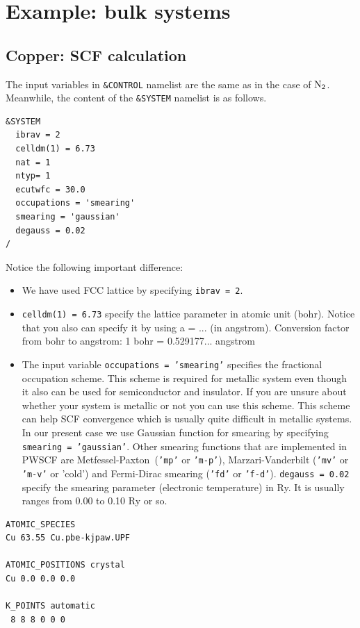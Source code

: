 \documentclass[12pt,english]{paper}
\begin{document}
\section{Example: bulk systems}


\subsection{Copper: SCF calculation}

The input variables in \texttt{\&CONTROL} namelist are the same as
in the case of $\ce{N2}$. Meanwhile, the content of the \texttt{\&SYSTEM}
namelist is as follows.

\begin{lstlisting}
&SYSTEM
  ibrav = 2
  celldm(1) = 6.73
  nat = 1
  ntyp= 1
  ecutwfc = 30.0
  occupations = 'smearing'
  smearing = 'gaussian'
  degauss = 0.02
/
\end{lstlisting}


Notice the following important difference:
\begin{itemize}
\item We have used FCC lattice by specifying \texttt{ibrav = 2}.
\item \texttt{celldm(1) = 6.73} specify the lattice parameter in atomic
unit (bohr). Notice that you also can specify it by using a = ...
(in angstrom). Conversion factor from bohr to angstrom: 1 bohr = 0.529177...
angstrom
\item The input variable \texttt{occupations = 'smearing'} specifies the
fractional occupation scheme. This scheme is required for metallic
system even though it also can be used for semiconductor and insulator.
If you are unsure about whether your system is metallic or not you
can use this scheme. This scheme can help SCF convergence which is
usually quite difficult in metallic systems. In our present case we
use Gaussian function for smearing by specifying \texttt{smearing
= 'gaussian'}. Other smearing functions that are implemented in PWSCF
are Metfessel-Paxton\texttt{ }(\texttt{'mp'} or \texttt{'m-p'}), Marzari-Vanderbilt
(\texttt{'mv'} or \texttt{'m-v'} or 'cold') and Fermi-Dirac smearing
(\texttt{'fd'} or \texttt{'f-d'}). \texttt{degauss = 0.02} specify
the smearing parameter (electronic temperature) in Ry. It is usually
ranges from 0.00 to 0.10 Ry or so.
\end{itemize}
\begin{lstlisting}
ATOMIC_SPECIES
Cu 63.55 Cu.pbe-kjpaw.UPF

ATOMIC_POSITIONS crystal
Cu 0.0 0.0 0.0

K_POINTS automatic
 8 8 8 0 0 0
\end{lstlisting}
\end{document}

